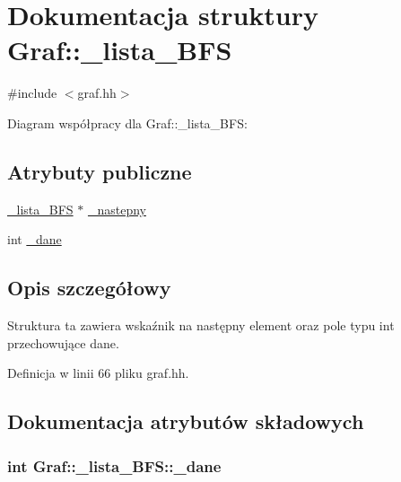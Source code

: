 \hypertarget{struct_graf_1_1__lista___b_f_s}{\section{\-Dokumentacja struktury \-Graf\-:\-:\-\_\-lista\-\_\-\-B\-F\-S}
\label{struct_graf_1_1__lista___b_f_s}
}


{\ttfamily \#include $<$graf.\-hh$>$}



\-Diagram współpracy dla \-Graf\-:\-:\-\_\-lista\-\_\-\-B\-F\-S\-:
\subsection*{\-Atrybuty publiczne}
\begin{DoxyCompactItemize}
\item 
\hyperlink{struct_graf_1_1__lista___b_f_s}{\-\_\-lista\-\_\-\-B\-F\-S} $\ast$ \hyperlink{struct_graf_1_1__lista___b_f_s_ad101a4841ac1d7c783fc24c4ef6790c1}{\-\_\-nastepny}
\item 
int \hyperlink{struct_graf_1_1__lista___b_f_s_a35804941f3d4d18c8afc8867e2204085}{\-\_\-dane}
\end{DoxyCompactItemize}


\subsection{\-Opis szczegółowy}
\-Struktura ta zawiera wskaźnik na następny element oraz pole typu int przechowujące dane. 

\-Definicja w linii 66 pliku graf.\-hh.



\subsection{\-Dokumentacja atrybutów składowych}
\hypertarget{struct_graf_1_1__lista___b_f_s_a35804941f3d4d18c8afc8867e2204085}{
\subsubsection[{\-\_\-dane}]{\setlength{\rightskip}{0pt plus 5cm}int {\bf \-Graf\-::\-\_\-lista\-\_\-\-B\-F\-S\-::\-\_\-dane}}}\label{struct_graf_1_1__lista___b_f_s_a35804941f3d4d18c8afc8867e2204085}


